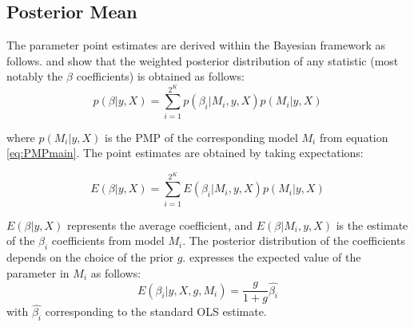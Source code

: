 \documentclass[a4paper,11pt]{article}
\begin{document}
\subsection*{Posterior Mean}
The parameter point estimates are derived within the Bayesian framework as follows. \citet{Zeugner2011} and \citet{MoralBenito2012} show that the weighted posterior distribution of any statistic (most notably the $\beta$ coefficients) is obtained as follows:
%
\begin{equation}\label{eq:parest}
p(\beta \vert y, X) = \sum_{i=1}^{2^{K}} p(\beta_{i} \vert M_{i},y,X)p(M_{i} \vert y,X)
\end{equation}

where $p(M_{i} \vert y, X)$ is the \ac{PMP} of the corresponding model $M_{i}$ from equation \ref{eq:PMPmain}. The point estimates are obtained by taking expectations:

\begin{equation}\label{eq:pointparest}
E(\beta \vert y, X) = \sum_{i=1}^{2^{K}} E(\beta_{i} \vert M_{i},y,X)p(M_{i} \vert y,X)
\end{equation}

$E(\beta \vert y, X)$ represents the average coefficient, and $E(\beta \vert M_{i},y,X)$ is the estimate of the $\beta_{i}$ coefficients from model $M_{i}$. The posterior distribution of the coefficients depends on the choice of the prior $g$. \citet{Zeugner2011} expresses the expected value of the parameter in $M_{i}$ as follows:
\begin{equation}\label{eq:postdist}
E(\beta_{i} \vert y,X,g,M_{i}) = \frac{g}{1+g}\hat{\beta_{i}}
\end{equation}
with $\hat{\beta_{i}}$ corresponding to the standard OLS estimate.
\end{document}
